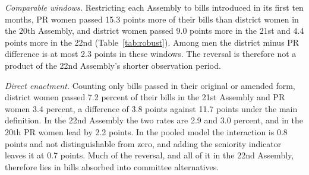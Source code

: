 \documentclass[11pt]{article}
\begin{document}
\textit{Comparable windows.} Restricting each Assembly to bills introduced in its first ten months, PR women passed 15.3 points more of their bills than district women in the 20th Assembly, and district women passed 9.0 points more in the 21st and 4.4 points more in the 22nd (Table~\ref{tab:robust}). Among men the district minus PR difference is at most 2.3 points in these windows. The reversal is therefore not a product of the 22nd Assembly's shorter observation period.

\textit{Direct enactment.} Counting only bills passed in their original or amended form, district women passed 7.2 percent of their bills in the 21st Assembly and PR women 3.4 percent, a difference of 3.8 points against 11.7 points under the main definition. In the 22nd Assembly the two rates are 2.9 and 3.0 percent, and in the 20th PR women lead by 2.2 points. In the pooled model the interaction is 0.8 points and not distinguishable from zero, and adding the seniority indicator leaves it at 0.7 points. Much of the reversal, and all of it in the 22nd Assembly, therefore lies in bills absorbed into committee alternatives.
\end{document}
